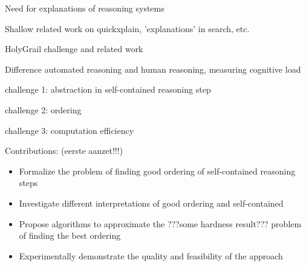 Need for explanations of reasoning systems

Shallow related work on quickxplain, 'explanations' in search, etc.

HolyGrail challenge and related work

Difference automated reasoning and human reasoning, measuring cognitive load

challenge 1: abstraction in self-contained reasoning step

challenge 2: ordering

challenge 3: computation efficiency

Contributions: (eerste aanzet!!!)

\begin{itemize}
	\item Formalize the problem of finding good ordering of self-contained reasoning steps
	\item Investigate different interpretations of good ordering and self-contained
	\item Propose algorithms to approximate the ???some hardness result??? problem of finding the best ordering
	\item Experimentally demonstrate the quality and feasibility of the approach
\end{itemize}


